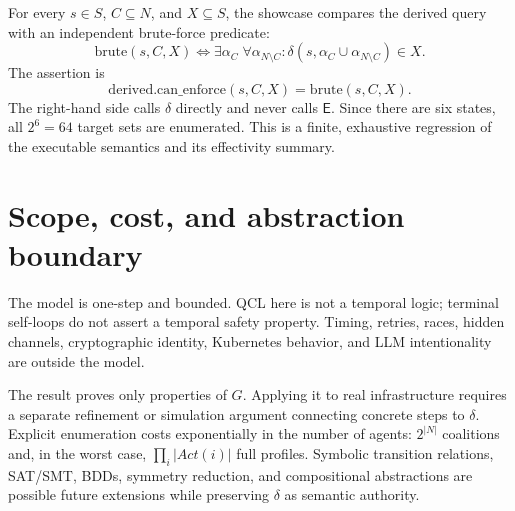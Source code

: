 \documentclass[11pt]{article}
\newcommand{\Agents}{\mathit{N}}
\newcommand{\States}{\mathit{S}}
\newcommand{\Act}{\mathit{Act}}
\newcommand{\Eff}{\mathsf{E}}
\begin{document}
For every $s\in\States$, $C\subseteq\Agents$, and $X\subseteq\States$, the
showcase compares the derived query with an independent brute-force predicate:
\[
 \mathrm{brute}(s,C,X)\iff
 \exists\alpha_C\;\forall\alpha_{\Agents\setminus C}:
 \delta(s,\alpha_C\cup\alpha_{\Agents\setminus C})\in X.
\]
The assertion is
\[
 \mathrm{derived.can\_enforce}(s,C,X)=\mathrm{brute}(s,C,X).
\]
The right-hand side calls $\delta$ directly and never calls $\Eff$. Since there
are six states, all $2^6=64$ target sets are enumerated. This is a finite,
exhaustive regression of the executable semantics and its effectivity summary.

\section{Scope, cost, and abstraction boundary}

The model is one-step and bounded. QCL here is not a temporal logic; terminal
self-loops do not assert a temporal safety property. Timing, retries, races,
hidden channels, cryptographic identity, Kubernetes behavior, and LLM
intentionality are outside the model.

The result proves only properties of $G$. Applying it to real infrastructure
requires a separate refinement or simulation argument connecting concrete
steps to $\delta$. Explicit enumeration costs exponentially in the number of
agents: $2^{|\Agents|}$ coalitions and, in the worst case,
$\prod_i|\Act(i)|$ full profiles. Symbolic transition relations, SAT/SMT,
BDDs, symmetry reduction, and compositional abstractions are possible future
extensions while preserving $\delta$ as semantic authority.
\end{document}
